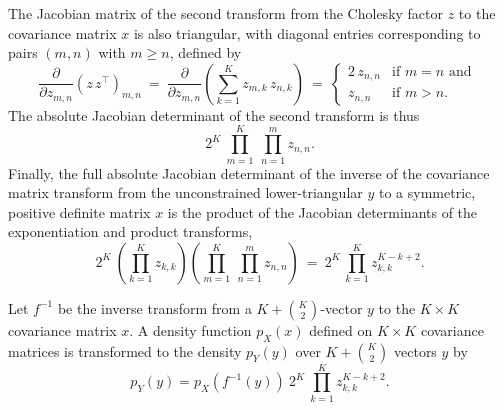 The Jacobian matrix of the second transform from the Cholesky factor $z$ to
the covariance matrix $x$ is also triangular, with diagonal entries
corresponding to pairs $(m,n)$ with $m \geq n$, defined by
\[
\frac{\partial}{\partial z_{m,n}}
\left( z \, z^{\top} \right)_{m,n}
\ = \
\frac{\partial}{\partial z_{m,n}}
\left( \sum_{k=1}^K z_{m,k} \, z_{n,k} \right)
\ = \
\left\{
\begin{array}{cl}
2 \, z_{n,n} & \mbox{if } m = n \mbox{ and }
\\[4pt]
z_{n,n} & \mbox{if } m > n.
\end{array}
\right.
\]
%
The absolute Jacobian determinant of the second transform is thus
\[
2^{K} 
\
\prod_{m = 1}^{K} \ \prod_{n=1}^{m} z_{n,n}.
\]
Finally, the full absolute Jacobian determinant of the inverse
of the covariance matrix transform from the unconstrained lower-triangular 
$y$ to a symmetric, positive definite matrix $x$ is the product of the
Jacobian determinants of the exponentiation and product transforms,
\[
2^{K} 
\
\left( \prod_{k=1}^K z_{k,k} \right)
\left( \prod_{m = 1}^{K} \ \prod_{n=1}^{m} z_{n,n} \right)
\ = \
2^K
\, \prod_{k=1}^K z_{k,k}^{K-k+2}.
\]

Let $f^{-1}$ be the inverse transform from a $K + {K \choose
  2}$-vector $y$ to the $K \times K$ covariance matrix $x$.  A density
function $p_X(x)$ defined on $K \times K$ covariance matrices is
transformed to the density $p_Y(y)$ over $K + {K \choose 2}$ vectors
$y$ by
\[
p_Y(y) = p_X(f^{-1}(y)) \ 2^K \ \prod_{k=1}^K z_{k,k}^{K-k+2}.
\]







